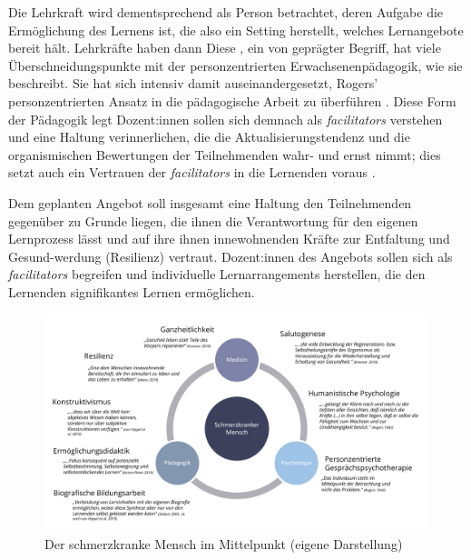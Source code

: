 \documentclass[
  twoside,
  parskip=half-,
  paper=176mm:246mm,
  BCOR=14mm,
  DIV=14,
]{scrreprt}
\begin{document}
Die Lehrkraft wird dementsprechend als  Person betrachtet, deren Aufgabe die Ermöglichung des Lernens ist, die also ein Setting herstellt, welches Lernangebote bereit hält. Lehrkräfte haben dann   Diese , ein von \citeauthor{arnold} geprägter Begriff, hat viele Überschneidungspunkte mit der personzentrierten Erwachsenenpädagogik, wie \citeauthor{kunze} sie beschreibt. Sie hat sich intensiv damit auseinandergesetzt, Rogers' personzentrierten Ansatz in die pädagogische Arbeit zu überführen \autocite[Kap. 5]{kunze}. Diese Form der Pädagogik legt  Dozent:innen sollen sich demnach als \textit{facilitators} verstehen und eine Haltung verinnerlichen, die die Aktualisierungstendenz und die organismischen Bewertungen der Teilnehmenden wahr- und ernst nimmt; dies setzt auch ein Vertrauen der \textit{facilitators} in die Lernenden voraus \autocite[vgl.][281]{kunze}. 

\begin{praxis}
  Dem geplanten Angebot soll insgesamt eine Haltung den Teilnehmenden gegenüber zu Grunde liegen, die ihnen die Verantwortung für den eigenen Lernprozess lässt und auf ihre ihnen innewohnenden Kräfte zur Entfaltung und Gesund-werdung (Resilienz) vertraut. Dozent:innen des Angebots sollen sich als \textit{facilitators} begreifen und individuelle Lernarrangements herstellen, die den Lernenden signifikantes Lernen ermöglichen. 
\end{praxis} 


\begin{figure}
  \centering
  \includegraphics[angle=90, origin=c, height=0.8\paperwidth]{Grafiken/Der Schmerzkranke im Mittelpunkt.pdf}
  \caption{Der schmerzkranke Mensch im Mittelpunkt (eigene Darstellung)}
  \label{fig:schmerzmensch}
\end{figure}
\end{document}
